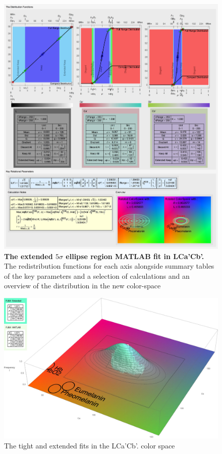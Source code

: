 \begin{figure}[h!]
  \centering
  \includegraphics[width=1.0 \textwidth]{Chapter3/Figs/Distribution_Results_Final_Extended.jpg} 
    \caption{ \textbf{The extended $5\sigma$ ellipse region MATLAB fit in LCa'Cb'.} The redistribution functions for each axis alongside summary tables of the key parameters and a selection of calculations and an overview of the distribution in the new color-space }  \label{fig:DistributionResultsFinalExtended}
\end{figure}

\begin{figure}[h!]
  \centering
  \includegraphics[width=0.95 \textwidth]{Chapter3/Figs/Distribution_Results_Final_Extended_3D.jpg} 
    \caption{ The tight and extended fits in the LCa'Cb'. color space }  \label{fig:DistributionResultsFinalExtended3D}
\end{figure}

